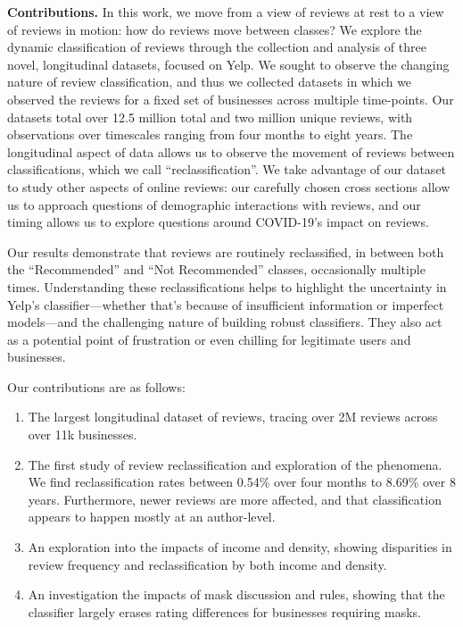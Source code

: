 \textbf{Contributions.} In this work, we move from a view of reviews at rest to a view of reviews in motion: how do reviews move between classes? We explore the dynamic classification of reviews through the collection and analysis of three novel, longitudinal datasets, focused on Yelp. We sought to observe the changing nature of review classification, and thus we collected datasets in which we observed the reviews for a fixed set of businesses across multiple time-points. Our datasets total over 12.5 million total and two million unique reviews, with observations over timescales ranging from four months to eight years. The longitudinal aspect of data allows us to observe the movement of reviews between classifications, which we call ``reclassification''. We take advantage of our dataset to study other aspects of online reviews: our carefully chosen cross sections allow us to approach questions of demographic interactions with reviews, and our timing allows us to explore questions around COVID-19's impact on reviews.

Our results demonstrate that reviews are routinely reclassified, in between both the ``Recommended'' and ``Not Recommended'' classes, occasionally multiple times. Understanding these reclassifications helps to highlight the uncertainty in Yelp's classifier---whether that's because of insufficient information or imperfect models---and the challenging nature of building robust classifiers. They also act as a potential point of frustration or even chilling for legitimate users and businesses.

Our contributions are as follows:
\begin{enumerate}
    \item The largest longitudinal dataset of reviews, tracing over 2M reviews across over 11k businesses.
    \item The first study of review reclassification and exploration of the phenomena. We find reclassification rates between 0.54\% over four months to 8.69\% over 8 years. Furthermore,  newer reviews are more affected, and that classification appears to happen mostly at an author-level.
    \item An exploration into the impacts of income and density, showing disparities in review frequency and reclassification by both income and density.
    \item An investigation  the impacts of mask discussion and rules, showing that the classifier largely erases rating differences for businesses requiring masks.
\end{enumerate}%


